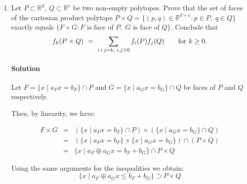 \documentclass[a4paper,10pt]{article}
\newcommand{\st}{ \; \left| \right. \;}
\newcommand{\R}{\mathbb{R}}
\begin{document}
\begin{enumerate}
\begin{proof}
      with equality if and only if all $p_{i_j}$ are vertices of $P$ in $F$. As $p\in F$, the equality is required. Thus, $p$ is in the convex hull of vertices of $P$ in the face $F$.
      
    \end{proof}

    \item Let $P\subset\R^d$, $Q\subset\R^e$ be two non-empty polytopes. Prove that the set of faces of the cartesian product polytope $P\times Q=\{(p,q)\in\R^{d+e}:p\in P,\; q\in Q\}$ exactly equals $\{F\times G: F\text{ is face of }P, \;G\text{ is face of }Q\}$. Conclude that
\[
    f_k(P\times Q)
    \ = \
    \sum_{%
      i+j=k,\;i,j\ge0}f_i(P) f_j(Q)
    \qquad
    \text{for } k\ge0.
\]


    \paragraph{Solution}
    
    Let $F = \{ x \st a_F x = b_F \} \cap P$ and $ G = \{ x \st a_G x = b_G\} \cap Q$ be faces of $P$ and $Q$ respectively.
    
    Then, by linearity, we have:
    
    \begin{displaymath}
      \begin{array}{ccc}
        F \times G &  = & \left(\{ x \st a_F x = b_F \} \cap P\right) \times \left( \{ x \st a_G x = b_G\} \cap Q \right) \\
         & = &  \left( \{ x \st a_F x = b_F \} \times \{ x \st a_G x = b_G\}\right) \cap \left(P\times Q\right)\\
         & = &  \{ x \st a_F\oplus a_G x = b_F + b_G\} \cap P \times Q
      \end{array}
    \end{displaymath}
    


    Using the same arguments for the inequalities we obtain:
    \begin{displaymath}
       \{ x \st a_F\oplus a_G x \leq b_F + b_G\} \supset P\times Q
    \end{displaymath}
    

\end{enumerate}
\end{document}

